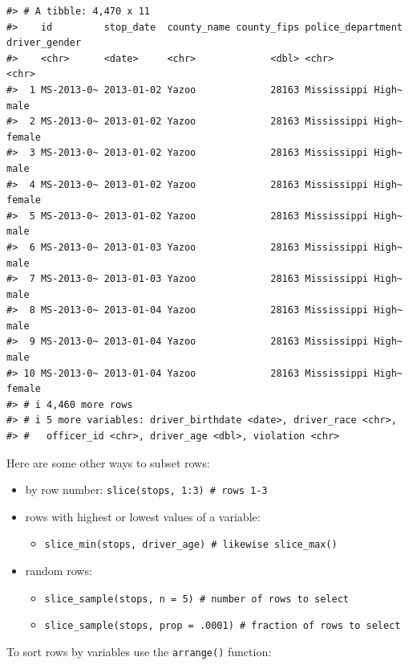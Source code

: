 \documentclass[
]{book}
\providecommand{\tightlist}{%
  \setlength{\itemsep}{0pt}\setlength{\parskip}{0pt}}
\begin{document}
\begin{verbatim}
#> # A tibble: 4,470 x 11
#>    id         stop_date  county_name county_fips police_department driver_gender
#>    <chr>      <date>     <chr>             <dbl> <chr>             <chr>        
#>  1 MS-2013-0~ 2013-01-02 Yazoo             28163 Mississippi High~ male         
#>  2 MS-2013-0~ 2013-01-02 Yazoo             28163 Mississippi High~ female       
#>  3 MS-2013-0~ 2013-01-02 Yazoo             28163 Mississippi High~ male         
#>  4 MS-2013-0~ 2013-01-02 Yazoo             28163 Mississippi High~ female       
#>  5 MS-2013-0~ 2013-01-02 Yazoo             28163 Mississippi High~ male         
#>  6 MS-2013-0~ 2013-01-03 Yazoo             28163 Mississippi High~ male         
#>  7 MS-2013-0~ 2013-01-03 Yazoo             28163 Mississippi High~ male         
#>  8 MS-2013-0~ 2013-01-04 Yazoo             28163 Mississippi High~ male         
#>  9 MS-2013-0~ 2013-01-04 Yazoo             28163 Mississippi High~ male         
#> 10 MS-2013-0~ 2013-01-04 Yazoo             28163 Mississippi High~ female       
#> # i 4,460 more rows
#> # i 5 more variables: driver_birthdate <date>, driver_race <chr>,
#> #   officer_id <chr>, driver_age <dbl>, violation <chr>
\end{verbatim}

Here are some other ways to subset rows:

\begin{itemize}
\tightlist
\item
  by row number: \texttt{slice(stops,\ 1:3)\ \#\ rows\ 1-3}
\item
  rows with highest or lowest values of a variable:

  \begin{itemize}
  \tightlist
  \item
    \texttt{slice\_min(stops,\ driver\_age)\ \#\ likewise\ slice\_max()}
  \end{itemize}
\item
  random rows:

  \begin{itemize}
  \tightlist
  \item
    \texttt{slice\_sample(stops,\ n\ =\ 5)\ \#\ number\ of\ rows\ to\ select}
  \item
    \texttt{slice\_sample(stops,\ prop\ =\ .0001)\ \#\ fraction\ of\ rows\ to\ select}
  \end{itemize}
\end{itemize}

To sort rows by variables use the \texttt{arrange()} function:
\end{document}
